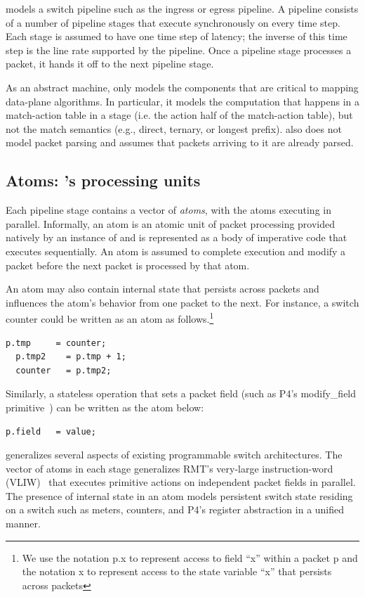 \absmachine models a switch pipeline such as the ingress or egress pipeline. A
pipeline consists of a number of pipeline stages that execute synchronously on
every time step. Each stage is assumed to have one time step of latency;
the inverse of this time step is the line rate supported by the pipeline. Once
a pipeline stage processes a packet, it hands it off to the next pipeline
stage.

As an abstract machine, \absmachine only models the components that are
critical to mapping data-plane algorithms. In particular, it models the
computation that happens in a match-action table in a stage (i.e. the action
half of the match-action table), but not the match semantics (e.g., direct,
ternary, or longest prefix). \absmachine also does not model packet parsing and
assumes that packets arriving to it are already parsed.

\subsection{Atoms: \absmachine's processing units}

Each pipeline stage contains a vector of \textit{atoms}, with the atoms
executing in parallel. Informally, an atom is an atomic unit of packet
processing provided natively by an instance of \absmachine and is represented
as a body of imperative code that executes sequentially. An atom is assumed to
complete execution and modify a packet before the next packet is processed by
that atom.

An atom may also contain internal state that persists across packets and
influences the atom's behavior from one packet to the next. For instance, a
switch counter could be written as an atom as follows.\footnote{We use the
  notation p.x to represent access to field ``x'' within a packet p and the
  notation x to represent access to the state variable ``x'' that persists across packets}
  \begin{lstlisting}[style=customc]
  p.tmp     = counter;
  p.tmp2    = p.tmp + 1;
  counter   = p.tmp2;
  \end{lstlisting}
Similarly, a stateless operation that sets a packet field (such as P4's
modify\_field primitive~\cite{p4spec}) can be written as the atom
below:
\begin{lstlisting}[style=customc]
p.field   = value;
\end{lstlisting}

\absmachine generalizes several aspects of existing programmable switch
architectures. The vector of atoms in each stage generalizes RMT's very-large
instruction-word (VLIW)~\cite{rmt} that executes primitive actions on
independent packet fields in parallel. The presence of internal state in an
atom models persistent switch state residing on a switch such as meters,
counters, and P4's register abstraction in a unified manner.

